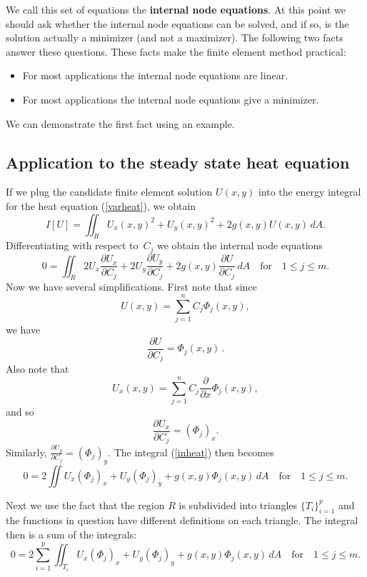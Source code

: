 We call this set of equations the {\bf internal node equations}. At this
point we should ask whether the internal node equations can be solved, and
if so, is the solution actually a minimizer (and not a maximizer). The following
two facts answer these questions. These facts make the finite element method
practical:
\begin{itemize}
\item For most applications the internal node equations are linear.
\item For most applications the internal node equations give a minimizer.
\end{itemize}
We can demonstrate the first fact using an example.



\subsection*{Application to the steady state heat equation}

If we plug the candidate finite element solution $U(x,y)$ into the
energy integral for the heat equation (\ref{varheat}), we obtain
\begin{equation}\label{varheatU}
     I[U] =  \iint_R U_x(x,y)^2 + U_y(x,y)^2 + 2g(x,y) U(x,y) \,dA.
\end{equation}
Differentiating with respect to~$C_j$ we obtain the internal node equations
\begin{equation}\label{inheat}
     0 = \iint_R 2  U_x \frac{\partial U_x}{\partial C_j}
                        + 2 U_y \frac{\partial U_y}{\partial C_j}
                             + 2 g(x,y) \frac{\partial U}{\partial C_j} \,dA
\quad\text{for}\quad 1 \le j \le m.
\end{equation}
Now we have several simplifications. First note that since
$$
U(x,y) = \sum_{j=1}^n C_j \Phi_j(x,y),
$$
we have
$$
\frac{\partial U}{\partial C_j} = \Phi_j(x,y)
\,.
$$
Also note that
$$
U_x(x,y) = \sum_{j=1}^n C_j \frac{\partial}{\partial x} \Phi_j(x,y),
$$
and so
$$
\frac{\partial U_x}{\partial C_j}  = (\Phi_j)_x.
$$
Similarly, $\frac{\partial U_y}{\partial C_j} = (\Phi_j)_y$. The integral (\ref{inheat})
then becomes
$$
   0 =  2 \iint   U_x  (\Phi_j)_x
                        +  U_y (\Phi_j)_y
                             +  g(x,y) \Phi_j(x,y) \,dA
\quad\text{for}\quad 1 \le j \le m.
$$

Next we use the fact that the region $R$ is subdivided into triangles $\{T_i\}_{i=1}^p$
and the functions in question have different definitions on each triangle.
The integral then is a sum of the integrals:
$$
 0 = 2 \sum_{i=1}^p \iint_{T_i}   U_x  (\Phi_j)_x
                                     +  U_y (\Phi_j)_y
                                     +  g(x,y) \Phi_j(x,y) \,dA
\quad\text{for}\quad 1 \le j \le m.
$$

